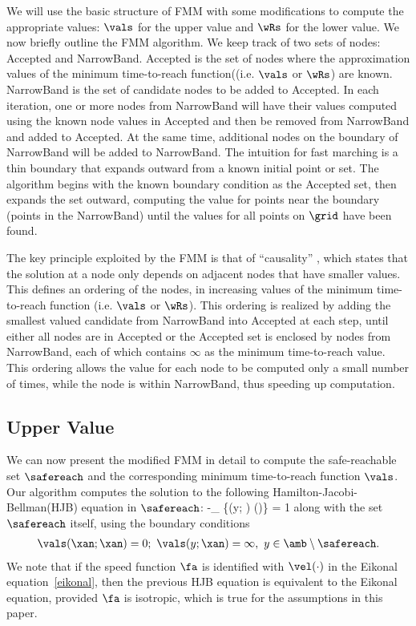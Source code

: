 We will use the basic structure of FMM with some modifications to compute the appropriate values: $\vals$ for the upper value and $\wRs$ for the lower value.
We now briefly outline the FMM algorithm.
We keep track of two sets of nodes: Accepted and NarrowBand. 
Accepted is the set of nodes where the approximation values of the minimum time-to-reach function((i.e. $\vals$ or $\wRs$) are known. 
NarrowBand is the set of candidate nodes to be added to Accepted.
 In each iteration, one or more nodes from NarrowBand will have their values computed using the known node values in Accepted and then be removed from NarrowBand and added to Accepted.
 At the same time, additional nodes on the boundary of NarrowBand will be added to NarrowBand.
The intuition for fast marching is a thin boundary that expands outward from a known initial point or set.
The algorithm begins with the known boundary condition as the Accepted set, then expands the set outward, computing the value for points near the boundary (points in the NarrowBand) until the values for all points on $\grid$ have been found.

The key principle exploited by the FMM is that of ``causality'' \cite{SethSIAM}, which states that the solution at a node only depends on adjacent nodes that have smaller values.
This defines an ordering of the nodes, in increasing values of the minimum time-to-reach function (i.e. $\vals$ or $\wRs$). 
This ordering is realized by adding the smallest valued candidate from NarrowBand into Accepted at each step, until either all nodes are in Accepted or the Accepted set is enclosed by nodes from NarrowBand, each of which contains $\infty$ as the minimum time-to-reach value.
This ordering allows the value for each node to be computed only a small number of times, while the node is within NarrowBand, thus speeding up computation.

\subsection{Upper Value}
We can now present the modified FMM in detail to compute the safe-reachable set $\safereach$ and the corresponding minimum time-to-reach function $\vals$. 
Our algorithm computes the solution to the following Hamilton-Jacobi-Bellman(HJB) equation in $\safereach$:
\bq\label{HJI}
-\inf_{\ca \in \unitball} \{\nabla \vals(y; \xan) \cdot \fa(\xa)\ca\} = 1
\eq
along with the set $\safereach$ itself, using the boundary conditions 
\begin{align}
\vals(\xan; \xan) = 0; \ \vals(y; \xan) = \infty, \ y \in \amb \setminus \safereach. 
\end{align}
We note that if the speed function $\fa$ is identified with $\vel(\cdot)$ in the Eikonal equation~\eqref{eikonal}, then the previous HJB equation is equivalent to the Eikonal equation, provided $\fa$ is isotropic, which is true for the assumptions in this paper.

